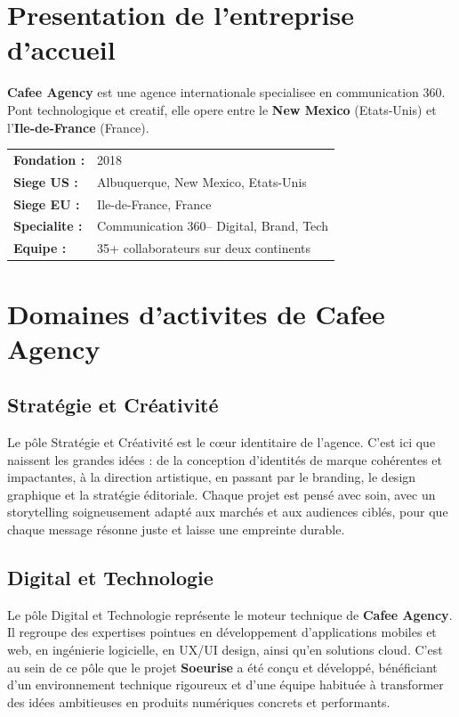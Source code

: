 \documentclass[12pt,a4paper]{report}
\begin{document}
	\section{Presentation de l'entreprise d'accueil}
	\begin{infobox}
		\textbf{Cafee Agency} est une agence internationale specialisee en communication 360\textdegree. Pont technologique et creatif, elle opere entre le \textbf{New Mexico} (Etats-Unis) et l'\textbf{Ile-de-France} (France).
		
		\medskip
		\begin{tabular}{@{}ll@{}}
			\textbf{Fondation :}  & 2018 \\
			\textbf{Siege US :}   & Albuquerque, New Mexico, Etats-Unis \\
			\textbf{Siege EU :}   & Ile-de-France, France \\
			\textbf{Specialite :} & Communication 360\textdegree -- Digital, Brand, Tech \\
			\textbf{Equipe :}     & 35+ collaborateurs sur deux continents \\
		\end{tabular}
	\end{infobox}
	
	\section{Domaines d'activites de Cafee Agency}
	
	\subsection{Stratégie et Créativité}
	
	Le pôle Stratégie et Créativité est le cœur identitaire de l'agence. C'est ici que 
	naissent les grandes idées : de la conception d'identités de marque cohérentes et 
	impactantes, à la direction artistique, en passant par le branding, le design graphique 
	et la stratégie éditoriale. Chaque projet est pensé avec soin, avec un storytelling 
	soigneusement adapté aux marchés et aux audiences ciblés, pour que chaque message 
	résonne juste et laisse une empreinte durable.
	
	\subsection{Digital et Technologie}
	
	Le pôle Digital et Technologie représente le moteur technique de \textbf{Cafee Agency}. 
	Il regroupe des expertises pointues en développement d'applications mobiles et web, 
	en ingénierie logicielle, en UX/UI design, ainsi qu'en solutions cloud. C'est au sein 
	de ce pôle que le projet \textbf{Soeurise} a été conçu et développé, bénéficiant d'un 
	environnement technique rigoureux et d'une équipe habituée à transformer des idées 
	ambitieuses en produits numériques concrets et performants.
	
\end{document}
